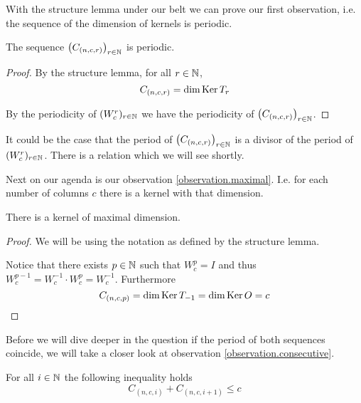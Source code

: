 With the structure lemma under our belt we can prove our first observation, i.e.
the sequence of the dimension of kernels is periodic.

\begin{proposition}
  The sequence $\left(C_{(n,c,r)}\right)_{r\in\mathbb{N}}$ is periodic.
\end{proposition}

\begin{proof}
  By the structure lemma, for all $r\in\mathbb{N}$,
  \[
  C_{(n,c,r)}
  =
  \dim\operatorname{Ker} T_{r}
  \]

  By the periodicity of $(W_{c}^{r})_{r\in\mathbb{N}}$ we have the
  periodicity of $\left(C_{(n,c,r)}\right)_{r\in\mathbb{N}}$.
\end{proof}

It could be the case that the period of $\left(C_{(n,c,r)}\right)_{r\in\mathbb{N}}$
is a divisor of the period of $(W_{c}^{r})_{r\in\mathbb{N}}$. There is a relation which 
we will see shortly.

Next on our agenda is our observation \ref{observation.maximal}. I.e. for each
number of columns $c$ there is a kernel with that dimension.

\begin{lemma}
  There is a kernel of maximal dimension.
\end{lemma}

\begin{proof}
  We will be using the notation as defined by the structure lemma.

  Notice that there exists $p\in\mathbb{N}$ such that $W_{c}^{p} = I$ and
  thus $W_{c}^{p-1} = W_{c}^{-1} \cdot W_{c}^{p} = W_{c}^{-1}$.
  Furthermore
  \[
  C_{(n,c,p)}
  =
  \dim\operatorname{Ker} T_{-1}
  =
  \dim\operatorname{Ker} O
  = c
  \]
\end{proof}

Before we will dive deeper in the question if the period of both sequences
coincide, we will take a closer look at observation \ref{observation.consecutive}.

\begin{theorem}
  For all $i\in\mathbb{N}$ the following inequality holds
  \[C_{(n, c, i)} + C_{(n, c, i+1)} \leq c\]
\end{theorem}


